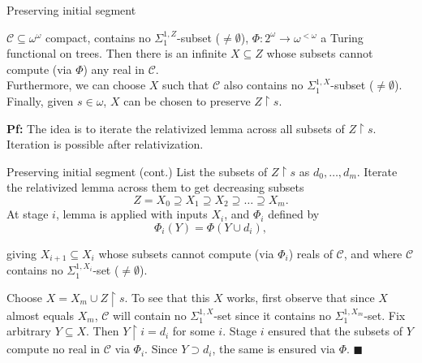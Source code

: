 \begin{frame}{Preserving initial segment}
  \begin{main-lemma*}
    $\mathcal{C}\subseteq\omega^\omega$ compact, contains no
    $\Sigma_1^{1,Z}$-subset ($\neq\emptyset$),
    $\Phi:2^{\omega}\rightarrow \omega^{<\omega}$ a Turing functional on
    trees. Then there is an infinite $X\subseteq Z$ whose subsets cannot
    compute (via $\Phi$) any real in $\mathcal{C}$.\\
    \vspace{0.5em}
    Furthermore, we can choose $X$ such that $\mathcal{C}$ also contains no
    $\Sigma_1^{1,X}$-subset ($\neq\emptyset$).\\
    \vspace{0.5em}
    Finally, given $s\in\omega$, $X$ can be chosen to preserve
    $Z\restriction s$.
  \end{main-lemma*}

  \vspace{1em}
  \textbf{Pf:} The idea is to iterate the relativized lemma across all
  subsets of $Z\restriction s$. Iteration is possible after relativization.
\end{frame}

\begin{frame}{Preserving initial segment (cont.)}
  List the subsets of $Z\restriction s$ as $d_0,\ldots,d_m$. Iterate the
  relativized lemma across them to get decreasing subsets
  \[Z=X_0 \supseteq X_1 \supseteq X_2 \supseteq\ldots \supseteq X_m.\]
  At stage $i$, lemma is applied with inputs $X_i$, and $\Phi_i$ defined
  by
  \[\Phi_i(Y) =\Phi(Y\cup d_i),\]

  giving $X_{i+1}\subseteq X_i$ whose subsets cannot compute (via
  $\Phi_i$) reals of $\mathcal{C}$, and where $\mathcal{C}$ contains no
  $\Sigma_1^{1,X_i}$-set ($\neq\emptyset$).

  \vspace{0.5em}
  Choose $X=X_m\cup Z\restriction s$. To see that this $X$ works, first
  observe that since $X$ almost equals $X_m$, $\mathcal{C}$ will
  contain no $\Sigma_1^{1,X}$-set since it contains no
  $\Sigma_1^{1,X_m}$-set. Fix arbitrary $Y\subseteq X$. Then
  $Y\restriction i=d_i$ for some $i$. Stage $i$ ensured that the subsets of
  $Y$ compute no real in $\mathcal{C}$ via $\Phi_i$. Since $Y\supset
  d_i$, the same is ensured via $\Phi$. $\blacksquare$
\end{frame}

